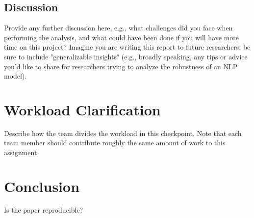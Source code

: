 \documentclass[11pt,a4paper]{article}
\begin{document}
\subsection{Discussion} 
Provide any further discussion here, e.g., what challenges did you face when performing the analysis, and what could have been done if you will have more time on this project? Imagine you are writing this report to future researchers; be sure to include "generalizable insights" (e.g., broadly speaking, any tips or advice you'd like to share for researchers trying to analyze the robustness of an NLP model).

\section{Workload Clarification}
Describe how  the team divides the workload in this checkpoint. Note that each team member should contribute roughly the same amount of work to this assignment.

\section{Conclusion}
Is the paper reproducible?



\end{document}
